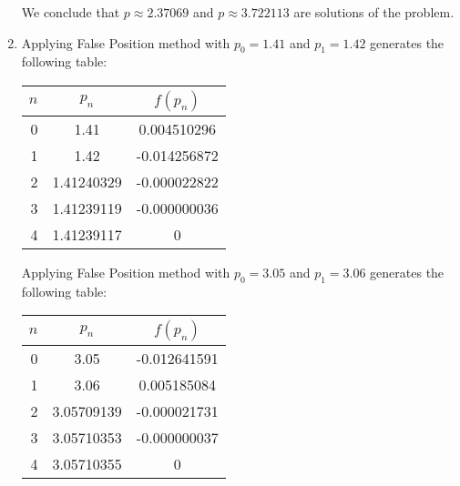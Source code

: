\documentclass[../../../../Assignments]{subfiles}
\begin{document}
\begin{solution}
\begin{enumerate}[label = \alph*)]
            We conclude that \(p \approx \num{2.37069}\) and \(p \approx
            \num{3.722113}\) are solutions of the problem.

        \item Applying False Position method with \(p_0 = \num{1.41}\) and \(p_1
            = \num{1.42}\) generates the following table:

            \begin{table}[H]
                \centering
                \begin{tabular}{r S[table-format=1.8] S[table-format=-1.9]}
                    \toprule
                    \(n\)  &   {\(p_n\)}   &  {\(f(p_n)\)}  \\
                      &  1.41         &   0.004510296  \\
                        1  &  1.42         &  -0.014256872  \\
                        2  &  1.41240329   &  -0.000022822  \\
                        3  &  1.41239119   &  -0.000000036  \\
                        4  &  1.41239117   &   0            \\
                        \bottomrule
                \end{tabular}
            \end{table}

            Applying False Position method with \(p_0 = \num{3.05}\) and \(p_1 =
            \num{3.06}\) generates the following table:

            \begin{table}[H]
                \centering
                \begin{tabular}{r S[table-format=1.8] S[table-format=-1.9]}
                    \toprule
                    \(n\)  &   {\(p_n\)}   &  {\(f(p_n)\)}  \\
                      &  3.05         &  -0.012641591  \\
                        1  &  3.06         &   0.005185084  \\
                        2  &  3.05709139   &  -0.000021731  \\
                        3  &  3.05710353   &  -0.000000037  \\
                        4  &  3.05710355   &   0            \\
                    \bottomrule
                \end{tabular}
            \end{table}


\end{enumerate}
\end{solution}
\end{document}
